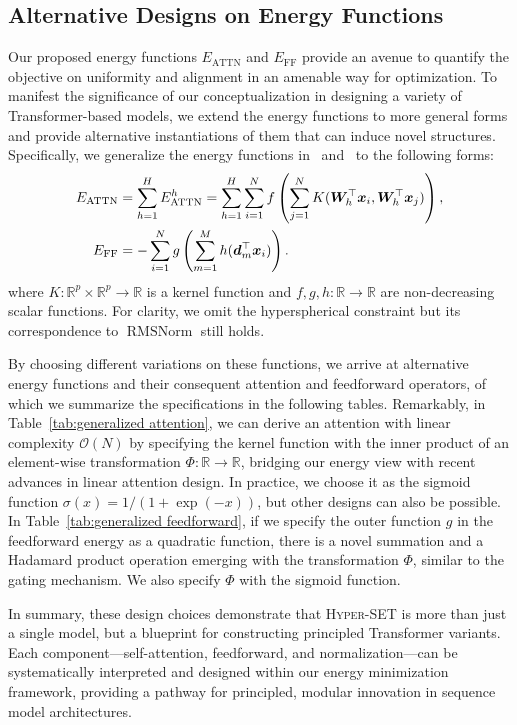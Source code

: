 \subsection{Alternative Designs on Energy Functions}
\label{section:alternative designs}
Our proposed energy functions $E_\text{ATTN}$ and $E_\text{FF}$ provide an avenue to quantify the objective on uniformity and alignment in an amenable way for optimization. To manifest the significance of our conceptualization in designing a variety of Transformer-based models, we extend the energy functions to more general forms and provide alternative instantiations of them that can induce novel structures. Specifically, we generalize the energy functions in~ and~ to the following forms:
\begin{align}
E_\text{ATTN} &= \sum_{h=1}^H E_\text{ATTN}^h = \sum_{h=1}^H\sum_{i=1}^N f\left( \sum_{j=1}^N K({\bm{W}}_h^\top{\bm{x}}_i, {\bm{W}}_h^\top{\bm{x}}_j)\right), \label{eq:generalized attn} \\
E_\text{FF} &= - \sum_{i=1}^N g\left(\sum_{m=1}^M h({\bm{d}}_m^\top {\bm{x}}_i)\right). \label{eq:generalized ff}
\end{align}
where $K:\mathbb{R}^p \times \mathbb{R}^p \rightarrow \mathbb{R} $ is a kernel function and $f,g,h: \mathbb{R} \rightarrow\mathbb{R}$ are non-decreasing scalar functions. For clarity, we omit the hyperspherical constraint but its correspondence to $\operatorname{RMSNorm}$ still holds. 

By choosing different variations on these functions, we arrive at alternative energy functions and their consequent attention and feedforward operators, of which we summarize the specifications in the following tables. Remarkably, in Table~\ref{tab:generalized attention}, we can derive an attention with linear complexity $\mathcal{O}(N)$ by specifying the kernel function with the inner product of an element-wise transformation $\Phi: \mathbb{R} \rightarrow \mathbb{R}$, bridging our energy view with recent advances in linear attention design. In practice, we choose it as the sigmoid function $\sigma(x) = 1/(1+\exp(-x))$, but other designs can also be possible. In Table~\ref{tab:generalized feedforward}, if we specify the outer function $g$ in the feedforward energy as a quadratic function, there is a novel summation and a Hadamard product operation emerging with the transformation $\Phi$, similar to the gating mechanism. We also specify $\Phi$ with the sigmoid function.


In summary, these design choices demonstrate that \textsc{Hyper-SET} is more than just a single model, but a blueprint for constructing principled Transformer variants. Each component—self-attention, feedforward, and normalization—can be systematically interpreted and designed within our energy minimization framework, providing a pathway for principled, modular innovation in sequence model architectures. 

